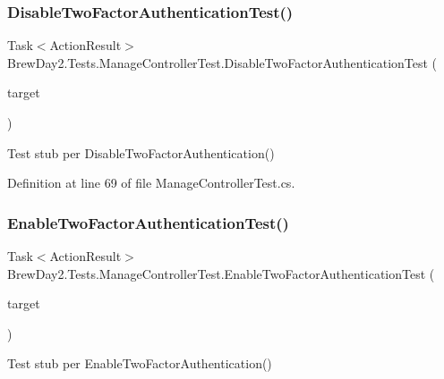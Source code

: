 \subsubsection{\texorpdfstring{Disable\+Two\+Factor\+Authentication\+Test()}{DisableTwoFactorAuthenticationTest()}}
{\footnotesize\ttfamily Task$<$Action\+Result$>$ Brew\+Day2.\+Tests.\+Manage\+Controller\+Test.\+Disable\+Two\+Factor\+Authentication\+Test (\begin{DoxyParamCaption}\item[{\mbox{[}\+Pex\+Assume\+Under\+Test\mbox{]} \mbox{\hyperlink{class_brew_day2_1_1_controllers_1_1_manage_controller}{Manage\+Controller}}}]{target }\end{DoxyParamCaption})}



Test stub per Disable\+Two\+Factor\+Authentication()



Definition at line 69 of file Manage\+Controller\+Test.\+cs.

\mbox{\label{class_brew_day2_1_1_tests_1_1_manage_controller_test_a3db4eb01911e39ecc57aa38f7b802b4a}} 
\subsubsection{\texorpdfstring{Enable\+Two\+Factor\+Authentication\+Test()}{EnableTwoFactorAuthenticationTest()}}
{\footnotesize\ttfamily Task$<$Action\+Result$>$ Brew\+Day2.\+Tests.\+Manage\+Controller\+Test.\+Enable\+Two\+Factor\+Authentication\+Test (\begin{DoxyParamCaption}\item[{\mbox{[}\+Pex\+Assume\+Under\+Test\mbox{]} \mbox{\hyperlink{class_brew_day2_1_1_controllers_1_1_manage_controller}{Manage\+Controller}}}]{target }\end{DoxyParamCaption})}



Test stub per Enable\+Two\+Factor\+Authentication()




